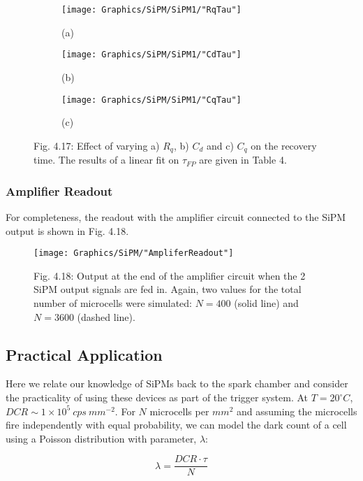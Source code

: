 \begin{figure}[h]
  \centering
  \begin{subfigure}
    \centering
    \texttt{[image: Graphics/SiPM/SiPM1/"RqTau"]}
    \caption*{(a)}
  \end{subfigure}
  \begin{subfigure}
    \centering
    \texttt{[image: Graphics/SiPM/SiPM1/"CdTau"]}
    \caption*{(b)}
  \end{subfigure}
  \begin{subfigure}
    \centering
    \texttt{[image: Graphics/SiPM/SiPM1/"CqTau"]}
    \caption*{(c)}
  \end{subfigure}
  {\caption*{Fig. 4.17: Effect of varying a) $R_q$, b) $C_d$ and c) $C_q$ on the recovery time. The results of a linear fit on $\tau_{FP}$ are given in Table 4.}}
\end{figure}

\subsubsection{Amplifier Readout}

For completeness, the readout with the amplifier circuit connected to the SiPM output is shown in Fig. 4.18.

\begin{figure}[h]
  \centering
  \texttt{[image: Graphics/SiPM/"AmpliferReadout"]}
  {\caption*{Fig. 4.18: Output at the end of the amplifier circuit when the 2 SiPM output signals are fed in. Again, two values for the total number of microcells were simulated: $N=400$ (solid line) and $N=3600$ (dashed line).}}
\end{figure}

\subsection{Practical Application}

\noindent Here we relate our knowledge of SiPMs back to the spark chamber and consider the practicality of using these devices as part of the trigger system. At \(T=20^\circ C\), \(DCR \sim 1\times 10^5 \ cps \ mm^{-2}\). For \(N\) microcells per $mm^{2}$ and assuming the microcells fire independently with equal probability, we can model the dark count of a cell using a Poisson distribution with parameter, $\lambda$:

\[
  \lambda = \frac{DCR \cdot \tau}{N}
\]

